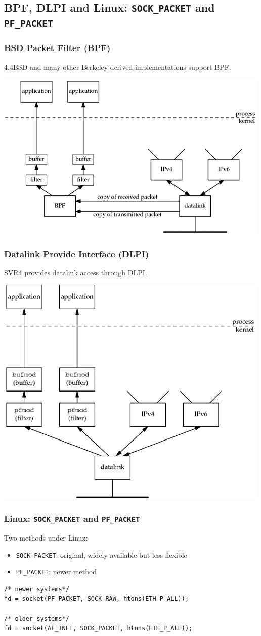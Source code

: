 \documentclass[notes,serif]{beamer}
\begin{document}
\subsection{BPF, DLPI and Linux: \texttt{SOCK\_PACKET} and \texttt{PF\_PACKET}}
\begin{frame}
\frametitle{BSD Packet Filter (BPF)}
4.4BSD and many other Berkeley-derived implementations support BPF.
  \begin{center}
  \includegraphics[width=.65\textwidth]{figs/29fig01.png}
  \end{center}
\end{frame}

\begin{frame}
\frametitle{Datalink Provide Interface (DLPI)}
SVR4 provides datalink access through DLPI.
  \begin{center}
  \includegraphics[width=.6\textwidth]{figs/29fig02.png}
  \end{center}
\end{frame}

\begin{frame}[containsverbatim]
\frametitle{Linux: \texttt{SOCK\_PACKET} and \texttt{PF\_PACKET}}
Two methods under Linux: 
\begin{itemize}
  \item \texttt{SOCK\_PACKET}: original, widely available but less flexible
  \item \texttt{PF\_PACKET}: newer method
\end{itemize}
{\scriptsize
\begin{verbatim}
/* newer systems*/
fd = socket(PF_PACKET, SOCK_RAW, htons(ETH_P_ALL));
      
/* older systems*/
fd = socket(AF_INET, SOCK_PACKET, htons(ETH_P_ALL));     
\end{verbatim}
}
\end{frame}
\end{document}
